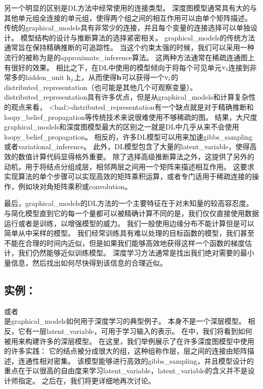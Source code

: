 另一个明显的区别是\gls{DL}方法中经常使用的连接类型。
深度图模型通常具有大的与其他单元组全连接的单元组，使得两个组之间的相互作用可以由单个矩阵描述。
传统的\gls{graphical_models}具有非常少的连接，并且每个变量的连接选择可以单独设计。
模型结构的设计与推断算法的选择紧密相关。
\gls{graphical_models}的传统方法通常旨在保持精确推断的可追踪性。
当这个约束太强的时候，我们可以采用一种流行的被称为是的\gls{approximate_inference}算法。
这两种方法通常在稀疏连通图上有很好的效果。
相比之下，在\gls{DL}中使用的模型倾向于将每个可见单元$\mathrm{v}_i$连接到非常多的\gls{hidden_unit} $\mathrm{h}_j$上，从而使得$\mathbf{h}$可以获得一个$\mathrm{v}_i$的\gls{distributed_representation}（也可能是其他几个可观察变量）。
\gls{distributed_representation}具有许多优点，但是从\gls{graphical_models}和计算复杂性的观点来看，
<bad>\gls{distributed_representation}有一个缺点就是对于精确推断和\gls{loopy_belief_propagation}等传统技术来说很难使用不够稀疏的图。
结果，大尺度\gls{graphical_models}和深度图模型最大的区别之一就是\gls{DL}中几乎从来不会使用\gls{loopy_belief_propagation}。
相反的，许多\gls{DL}模型可以用来加速\gls{gibbs_sampling}或者\gls{variational_inference}。
此外，\gls{DL}模型包含了大量的\gls{latent_variable}，使得高效的数值计算代码显得格外重要。
除了选择高级推断算法之外，这提供了另外的动机，用于将结点分组成层，相邻两层之间用一个矩阵来描述相互作用。
这要求实现算法的单个步骤可以实现高效的矩阵乘积运算，或者专门适用于稀疏连接的操作，例如块对角矩阵乘积或\gls{convolution}。



最后，\gls{graphical_models}的\gls{DL}方法的一个主要特征在于对未知量的较高容忍度。
与简化模型直到它的每一个量都可以被精确计算不同的是，我们仅仅直接使用数据运行或者是训练，以增强模型的威力。%
我们一般使用边缘分布不能计算但是可以简单从中采样的模型。
我们经常训练具有难以处理的目标函数的模型，我们甚至不能在合理的时间内近似，但是如果我们能够高效地获得这样一个函数的梯度估计，我们仍然能够近似训练模型。
深度学习方法通常是找出我们绝对需要的最小量信息，然后找出如何尽快得到该信息的合理近似。



\subsection{实例：}
\label{sec:example_the_restricted_boltzmann_machine}
\citep{Smolensky86}或者\\ 是\gls{graphical_models}如何用于深度学习的典型例子。 
本身不是一个深层模型。 
相反，它有一层\gls{latent_variable}，可用于学习输入的表示。 
在中，我们将看到如何被用来构建许多的深层模型。
在这里，我们举例展示了在许多深度图模型中使用的许多实践：
它的结点被分成很大的组，这种组称作层，层之间的连接由矩阵描述，连通性相对密集。
该模型能够进行高效的\gls{gibbs_sampling}，并且模型设计的重点在于以很高的自由度来学习\gls{latent_variable}，\gls{latent_variable}的含义并不是设计师指定。
之后在，我们将更详细地再次讨论。

